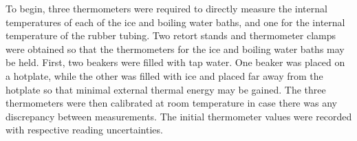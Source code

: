 \documentclass[11pt]{article}
\begin{document}
\begin{multicols}{2}
    To begin, three thermometers were required to directly measure the internal temperatures of each of the ice and boiling water baths, and one for the internal temperature of the rubber tubing. Two retort stands and thermometer clamps were obtained so that the thermometers for the ice and boiling water baths may be held. First, two beakers were filled with tap water. One beaker was placed on a hotplate, while the other was filled with ice and placed far away from the hotplate so that minimal external thermal energy may be gained. The three thermometers were then calibrated at room temperature in case there was any discrepancy between measurements. The initial thermometer values were recorded with respective reading uncertainties. 











\end{multicols}
\end{document}
